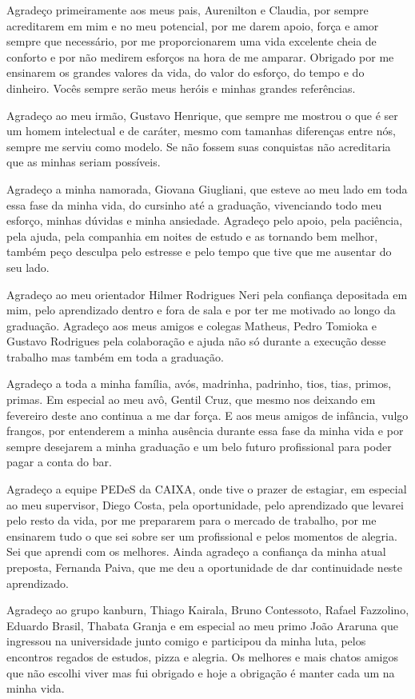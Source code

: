 \begin{agradecimentos}

Agradeço primeiramente aos meus pais, Aurenilton e Claudia, por sempre acreditarem em mim e no meu potencial, por me darem apoio, força e amor sempre que necessário, por me proporcionarem uma vida excelente cheia de conforto e por não medirem esforços na hora de me amparar. Obrigado por me ensinarem os grandes valores da vida, do valor do esforço, do tempo e do dinheiro. Vocês sempre serão meus heróis e minhas grandes referências.

Agradeço ao meu irmão, Gustavo Henrique, que sempre me mostrou o que é ser um homem intelectual e de caráter, mesmo com tamanhas diferenças entre nós, sempre me serviu como modelo. Se não fossem suas conquistas não acreditaria que as minhas seriam possíveis.

Agradeço a minha namorada, Giovana Giugliani, que esteve ao meu lado em toda essa fase da minha vida, do cursinho até a graduação, vivenciando todo meu esforço,  minhas dúvidas e minha ansiedade. Agradeço pelo apoio, pela paciência, pela ajuda, pela companhia em noites de estudo e as tornando bem melhor, também peço desculpa pelo estresse e pelo tempo que tive que me ausentar do seu lado. 

Agradeço ao meu orientador Hilmer Rodrigues Neri pela confiança depositada em mim, pelo aprendizado dentro e fora de sala e por ter me motivado ao longo da graduação. Agradeço aos meus amigos e colegas Matheus, Pedro Tomioka e Gustavo Rodrigues pela colaboração e ajuda não só durante a execução desse trabalho mas também em toda a graduação.

Agradeço a toda a minha família, avós, madrinha, padrinho, tios, tias, primos, primas. Em especial ao meu avô, Gentil Cruz, que mesmo nos deixando em fevereiro deste ano continua a me dar força. E aos meus amigos de infância, vulgo frangos, por entenderem a minha ausência durante essa fase da minha vida e por sempre desejarem a minha graduação e um belo futuro profissional para poder pagar a conta do bar.  

Agradeço a equipe PEDeS da CAIXA, onde tive o prazer de estagiar, em especial ao meu supervisor, Diego Costa, pela oportunidade, pelo aprendizado que levarei pelo resto da vida, por me prepararem para o mercado de trabalho, por me ensinarem tudo o que sei sobre ser um profissional e pelos momentos de alegria. Sei que aprendi com os melhores. Ainda agradeço a confiança da minha atual preposta, Fernanda Paiva, que me deu a oportunidade de dar continuidade neste aprendizado. 

Agradeço ao grupo kanburn, Thiago Kairala, Bruno Contessoto, Rafael Fazzolino, Eduardo Brasil, Thabata Granja e em especial ao meu primo João Araruna que ingressou na universidade junto comigo e participou da minha luta, pelos encontros regados de estudos, pizza e alegria. Os melhores e mais chatos amigos que não escolhi viver mas fui obrigado e hoje a obrigação é manter cada um na minha vida.

\end{agradecimentos}